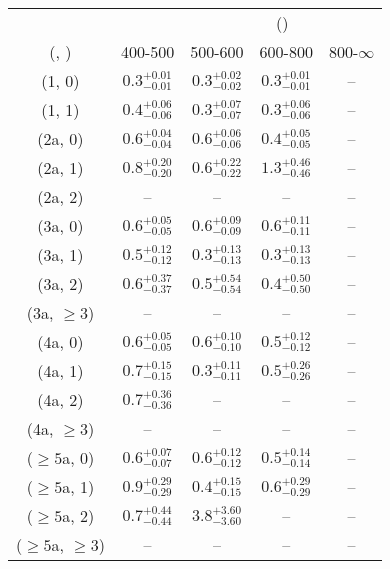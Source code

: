 \begin{table}[h!]
\tiny
\centering
{}
\begin{tabular}
{ccccc}
	\hline\hline
&	& \multicolumn{4}{c}{\scalht (\gev)} \\ 
	 (\njet,  \nb) & 400-500 & 500-600 & 600-800 & 800-$\infty$ \\ [0.8ex] 
\hline
	(1, 0) & $0.3^{+ 0.01 }_{- 0.01 }$ & $0.3^{+ 0.02 }_{- 0.02 }$ & $0.3^{+ 0.01 }_{- 0.01 }$ & -- \\[0.5ex] 
	(1, 1) & $0.4^{+ 0.06 }_{- 0.06 }$ & $0.3^{+ 0.07 }_{- 0.07 }$ & $0.3^{+ 0.06 }_{- 0.06 }$ & -- \\[0.5ex] 
	(2a, 0) & $0.6^{+ 0.04 }_{- 0.04 }$ & $0.6^{+ 0.06 }_{- 0.06 }$ & $0.4^{+ 0.05 }_{- 0.05 }$ & -- \\[0.5ex] 
	(2a, 1) & $0.8^{+ 0.20 }_{- 0.20 }$ & $0.6^{+ 0.22 }_{- 0.22 }$ & $1.3^{+ 0.46 }_{- 0.46 }$ & -- \\[0.5ex] 
	(2a, 2) & -- & -- & -- & -- \\[0.5ex] 
	(3a, 0) & $0.6^{+ 0.05 }_{- 0.05 }$ & $0.6^{+ 0.09 }_{- 0.09 }$ & $0.6^{+ 0.11 }_{- 0.11 }$ & -- \\[0.5ex] 
	(3a, 1) & $0.5^{+ 0.12 }_{- 0.12 }$ & $0.3^{+ 0.13 }_{- 0.13 }$ & $0.3^{+ 0.13 }_{- 0.13 }$ & -- \\[0.5ex] 
	(3a, 2) & $0.6^{+ 0.37 }_{- 0.37 }$ & $0.5^{+ 0.54 }_{- 0.54 }$ & $0.4^{+ 0.50 }_{- 0.50 }$ & -- \\[0.5ex] 
	(3a, $\ge3$) & -- & -- & -- & -- \\[0.5ex] 
	(4a, 0) & $0.6^{+ 0.05 }_{- 0.05 }$ & $0.6^{+ 0.10 }_{- 0.10 }$ & $0.5^{+ 0.12 }_{- 0.12 }$ & -- \\[0.5ex] 
	(4a, 1) & $0.7^{+ 0.15 }_{- 0.15 }$ & $0.3^{+ 0.11 }_{- 0.11 }$ & $0.5^{+ 0.26 }_{- 0.26 }$ & -- \\[0.5ex] 
	(4a, 2) & $0.7^{+ 0.36 }_{- 0.36 }$ & -- & -- & -- \\[0.5ex] 
	(4a, $\ge3$) & -- & -- & -- & -- \\[0.5ex] 
	($\ge5$a, 0) & $0.6^{+ 0.07 }_{- 0.07 }$ & $0.6^{+ 0.12 }_{- 0.12 }$ & $0.5^{+ 0.14 }_{- 0.14 }$ & -- \\[0.5ex] 
	($\ge5$a, 1) & $0.9^{+ 0.29 }_{- 0.29 }$ & $0.4^{+ 0.15 }_{- 0.15 }$ & $0.6^{+ 0.29 }_{- 0.29 }$ & -- \\[0.5ex] 
	($\ge5$a, 2) & $0.7^{+ 0.44 }_{- 0.44 }$ & $3.8^{+ 3.60 }_{- 3.60 }$ & -- & -- \\[0.5ex] 
	($\ge5$a, $\ge3$) & -- & -- & -- & -- \\[0.5ex] 
	\hline
	\hline
\end{tabular}
\end{table}

